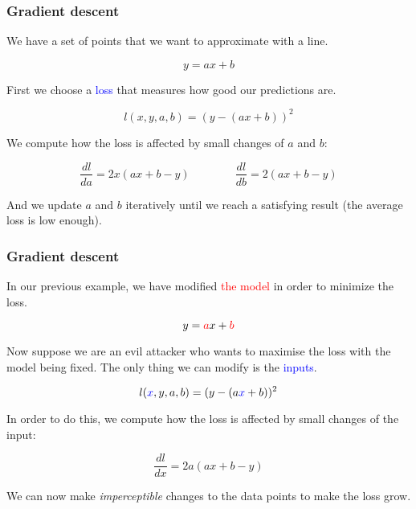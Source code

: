 \documentclass[9pt]{beamer}
\begin{document}
\begin{frame}
  \frametitle{Gradient descent}

  \begin{center}
    \scalebox{0.5}{
      
    }
  \end{center}

  We have a set of points that we want to approximate with a line.

  \[
  y = ax + b
  \]

  \pause

  First we choose a \textcolor{blue}{loss} that measures how good our
  predictions are.

  \[
  l(x, y, a, b) = (y - (a x + b))^{2}
  \]

  \pause

  We compute how the loss is affected by small changes of $a$ and
  $b$:

  \[
  \frac{dl}{da} = 2 x (ax + b - y) \qquad \qquad \frac{dl}{db} = 2 (ax + b - y)
  \]

  And we update $a$ and $b$ iteratively until we reach a satisfying
  result (the average loss is low enough).

\end{frame}

\begin{frame}
  \frametitle{Gradient descent}

  \begin{center}
    \scalebox{0.5}{
      
    }
  \end{center}

  In our previous example, we have modified \textcolor{red}{the model}
  in order to minimize the loss.

  \[
  y = \textcolor{red}{a}x + \textcolor{red}{b}
  \]

  \pause

  Now suppose we are an evil attacker who wants to maximise the loss
  with the model being fixed. The only thing we can modify is the
  \textcolor{blue}{inputs}.

  \[
  l(\textcolor{blue}{x}, y, a, b) = (y - (a \textcolor{blue}{x} + b))^{2}
  \]

  \pause

  In order to do this, we compute how the loss is affected by small
  changes of the input:

  \[
  \frac{dl}{dx} = 2 a (ax + b - y)
  \]

  We can now make \emph{imperceptible} changes to the data points to make
  the loss grow.
\end{frame}
\end{document}
